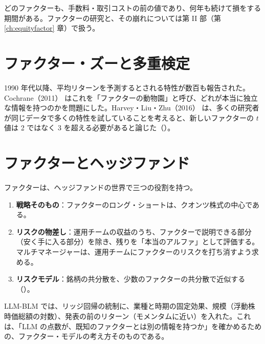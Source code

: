 どのファクターも、手数料・取引コストの前の値であり、何年も続けて損をする期間がある。ファクターの研究と、その崩れについては第 II 部（第 \ref{ch:equityfactor} 章）で扱う。

\section{ファクター・ズーと多重検定}

1990 年代以降、平均リターンを予測するとされる特性が数百も報告された。Cochrane（2011）\cite{cochrane2011} はこれを「ファクターの動物園」と呼び、どれが本当に独立な情報を持つのかを問題にした。Harvey・Liu・Zhu（2016）\cite{hlz2016} は、多くの研究者が同じデータで多くの特性を試していることを考えると、新しいファクターの $t$ 値は 2 ではなく 3 を超える必要があると論じた（）。

\section{ファクターとヘッジファンド}

ファクターは、ヘッジファンドの世界で三つの役割を持つ。

\begin{enumerate}
\item \textbf{戦略そのもの}：ファクターのロング・ショートは、クオンツ株式の中心である。
\item \textbf{リスクの物差し}：運用チームの収益のうち、ファクターで説明できる部分（安く手に入る部分）を除き、残りを「本当のアルファ」として評価する。マルチマネージャーは、運用チームにファクターのリスクを打ち消すよう求める。
\item \textbf{リスクモデル}：銘柄の共分散を、少数のファクターの共分散で近似する（）。
\end{enumerate}

\begin{projbox}
LLM-BLM では、リッジ回帰の統制に、業種と時期の固定効果、規模（浮動株時価総額の対数）、発表の前のリターン（モメンタムに近い）を入れた。これは、「LLM の点数が、既知のファクターとは別の情報を持つか」を確かめるための、ファクター・モデルの考え方そのものである。
\end{projbox}

